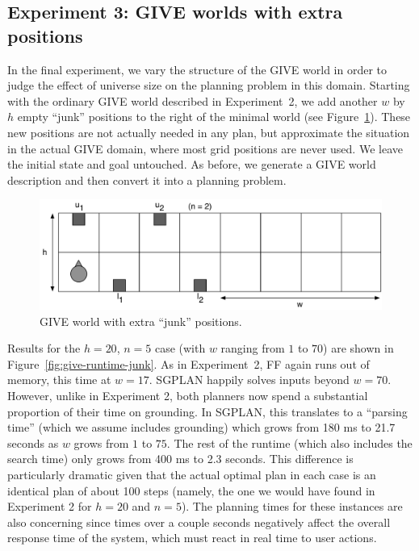 \subsection{Experiment 3: GIVE worlds with extra positions}
\label{sec:experiment-3:-give}

In the final experiment, we vary the structure of the GIVE world in order
to judge the effect of universe size on the planning problem in this
domain.  Starting with the ordinary GIVE world described in Experiment~2,
we add another $w$ by $h$ empty ``junk'' positions to the right of the
minimal world (see Figure~\ref{fig:give-junk}). These new positions are not
actually needed in any plan, but approximate the situation in the actual
GIVE domain, where most grid positions are never used. We leave the initial
state and goal untouched. As before, we generate a GIVE world description
and then convert it into a planning problem.

\begin{figure}
  \centering
  \includegraphics[width=1\columnwidth]{pic-empty-buttons}
  \caption{GIVE world with extra ``junk'' positions.}
  \label{fig:give-junk}
\end{figure}

Results for the $h=20$, $n=5$ case (with $w$ ranging from $1$ to $70$)
are shown in Figure~\ref{fig:give-runtime-junk}. As in Experiment~2,
FF again runs out of memory, this time at $w=17$. SGPLAN happily
solves inputs beyond $w=70$. However, unlike in Experiment 2, both
planners now spend a substantial proportion of their time on
grounding. In SGPLAN, this translates to a ``parsing time'' (which we
assume includes grounding) which grows from 180 ms to 21.7 seconds as
$w$ grows from $1$ to $75$. The rest of the runtime (which also
includes the search time) only grows from 400 ms to 2.3 seconds. This
difference is particularly dramatic given that the actual optimal plan
in each case is an identical plan of about 100 steps (namely, the one
we would have found in Experiment 2 for $h=20$ and $n=5$). The
planning times for these instances are also concerning since times
over a couple seconds negatively affect the overall response time of
the system, which must react in real time to user actions.

